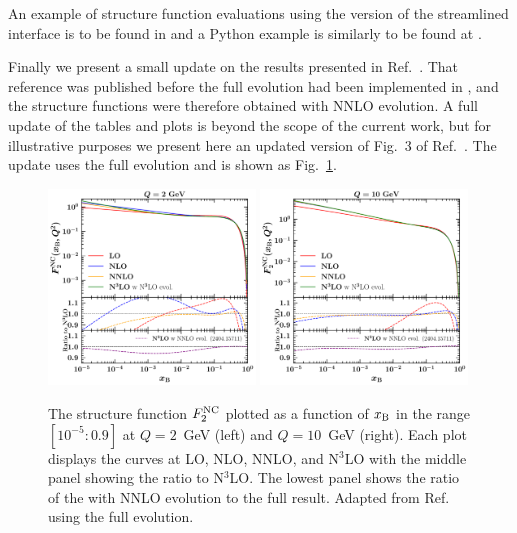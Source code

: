 An example of structure function evaluations using the \CPP{} version
of the streamlined interface is to be found in
and a Python example is similarly to be found at
.

Finally we present a small update on the results presented in
Ref.~\cite{Bertone:2024dpm}. That reference was published before the
full \ntlo evolution had been implemented in \hoppet, and the \ntlo
structure functions were therefore obtained with NNLO evolution. A
full update of the tables and plots is beyond the scope of the current
work, but for illustrative purposes we present here an updated version
of Fig.~3 of Ref.~\cite{Bertone:2024dpm}.
%
The update uses the full \ntlo evolution and is shown as
Fig.~\ref{fig:perturbativeconvergence}.
%
\begin{figure}[tb!]
  \centering\includegraphics[width=0.49\textwidth]{figs-v2/PerturbativeConvergence_Q_2_GeV.pdf}
  \centering\includegraphics[width=0.49\textwidth]{figs-v2/PerturbativeConvergence_Q_10_GeV.pdf}
  \caption{The structure function $F_2^{\rm NC}$ plotted as a function
    of $x_{\rm B}$ in the range $[10^{-5}:0.9]$ at $Q=2$~GeV (left)
    and $Q=10$~GeV (right). Each plot displays the curves at LO, NLO,
    NNLO, and N$^3$LO with the middle panel showing the ratio to
    N$^3$LO. The lowest panel shows the ratio of the \ntlo with NNLO
    evolution to the full \ntlo result. Adapted from
    Ref.~\cite{Bertone:2024dpm} using the full \ntlo evolution.}
  \label{fig:perturbativeconvergence}
\end{figure}
